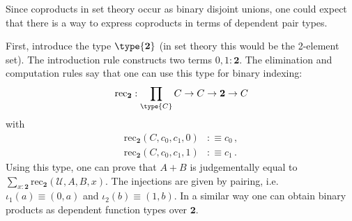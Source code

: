 
    Since coproducts in set theory occur as binary disjoint unions, one could expect that there is a way to express coproducts in terms of dependent pair types.
    \begin{construct}
        First, introduce the type $\type{\mathbf{2}}$ (in set theory this would be the 2-element set). The introduction rule constructs two terms $0,1:\mathbf{2}$. The elimination and computation rules say that one can use this type for binary indexing:
        \begin{gather}
            \mathrm{rec}_{\mathbf{2}}:\prod_{\type{C}}C\rightarrow C\rightarrow\mathbf{2}\rightarrow C
        \end{gather}
        with
        \begin{align}
            \mathrm{rec}_{\mathbf{2}}(C, c_0, c_1, 0)&:\equiv c_0\,,\\
            \mathrm{rec}_{\mathbf{2}}(C, c_0, c_1, 1)&:\equiv c_1\,.
        \end{align}
        Using this type, one can prove that $A+B$ is judgementally equal to $\sum_{x:\mathbf{2}}\mathrm{rec}_{\mathbf{2}}(\mathcal{U},A,B,x)$. The injections are given by pairing, i.e.~$\iota_1(a)\equiv(0,a)$ and $\iota_2(b)\equiv(1,b)$. In a similar way one can obtain binary products as dependent function types over $\mathbf{2}$.
    \end{construct}

